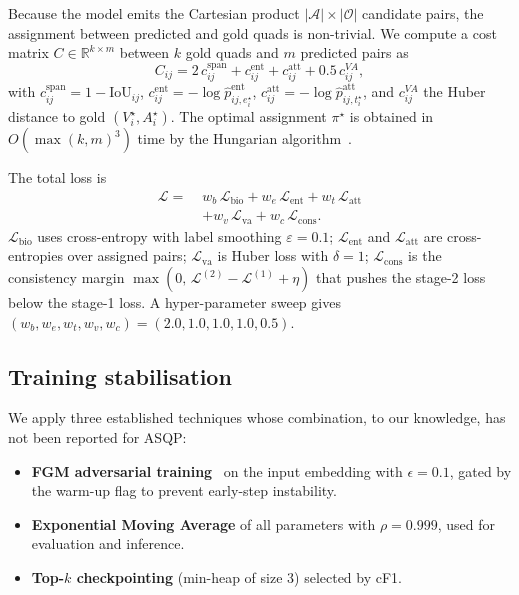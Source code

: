 \documentclass[runningheads]{llncs}
\begin{document}
Because the model emits the Cartesian product
$|\mathcal{A}|\times|\mathcal{O}|$ candidate pairs, the assignment
between predicted and gold quads is non-trivial. We compute a cost
matrix $C\in\mathbb{R}^{k\times m}$ between $k$ gold quads and $m$
predicted pairs as
\begin{equation}
C_{ij} = 2\, c^{\text{span}}_{ij}
       + c^{\text{ent}}_{ij}
       + c^{\text{att}}_{ij}
       + 0.5\, c^{VA}_{ij},
\label{eq:cost}
\end{equation}
with $c^{\text{span}}_{ij} = 1 - \mathrm{IoU}_{ij}$,
$c^{\text{ent}}_{ij} = -\log \hat p^\text{ent}_{ij,e_i^\star}$,
$c^{\text{att}}_{ij} = -\log \hat p^\text{att}_{ij,t_i^\star}$, and
$c^{VA}_{ij}$ the Huber distance to gold $(V_i^\star, A_i^\star)$.
The optimal assignment $\pi^\star$ is obtained in
$O(\max(k,m)^3)$ time by the Hungarian
algorithm~\cite{kuhn1955hungarian}.

The total loss is
\begin{equation}
\begin{split}
\mathcal{L} = \;& w_b\,\mathcal{L}_\text{bio}
            + w_e\,\mathcal{L}_\text{ent}
            + w_t\,\mathcal{L}_\text{att} \\
            &+ w_v\,\mathcal{L}_\text{va}
            + w_c\,\mathcal{L}_\text{cons}.
\end{split}
\label{eq:totalloss}
\end{equation}
$\mathcal{L}_\text{bio}$ uses cross-entropy with label smoothing
$\varepsilon{=}0.1$;
$\mathcal{L}_\text{ent}$ and $\mathcal{L}_\text{att}$ are
cross-entropies over assigned pairs;
$\mathcal{L}_\text{va}$ is Huber loss with $\delta{=}1$;
$\mathcal{L}_\text{cons}$ is the consistency margin
$\max(0,\,\mathcal{L}^{(2)}-\mathcal{L}^{(1)}+\eta)$ that pushes the
stage-2 loss below the stage-1 loss. A hyper-parameter sweep gives
$(w_b,w_e,w_t,w_v,w_c)=(2.0,1.0,1.0,1.0,0.5)$.

\subsection{Training stabilisation}
\label{sec:method:train}

We apply three established techniques whose combination, to our
knowledge, has not been reported for ASQP:
\begin{itemize}[itemsep=1pt,topsep=2pt,leftmargin=*]
\item \textbf{FGM adversarial training}~\cite{miyato2017adv} on the
      input embedding with $\epsilon=0.1$, gated by the warm-up flag
      to prevent early-step instability.
\item \textbf{Exponential Moving Average} of all parameters with
      $\rho=0.999$, used for evaluation and inference.
\item \textbf{Top-$k$ checkpointing} (min-heap of size 3) selected by
      cF1.
\end{itemize}
\end{document}
